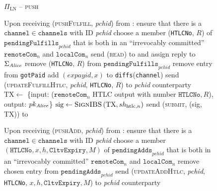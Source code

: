   \begin{figure}[H]
    \begin{protocolbox}{$\Pi_{\mathrm{LN}}$ -- \textsc{push}}
      \begin{algorithmic}[1]
        \State Upon receiving (\textsc{pushFulfill}, \textit{pchid}) from
        \environment:
        \label{alg:protocol:pushfulfill:start}
        \Indent
          \State ensure that there is a $\mathtt{channel} \in \mathtt{channels}$
          with ID \textit{pchid}
          \State choose a member (\texttt{HTLCNo}, $R$) of
          $\mathtt{pendingFulfills}_{\mathit{pchid}}$ that is both in an
          ``irrevocably committed'' $\mathtt{remoteCom}_n$ and
          $\mathtt{localCom}_n$
          \State send (\textsc{read}) to \ledger{} and assign reply to
          $\Sigma_{\mathit{Alice}}$
          \State remove (\texttt{HTLCNo}, $R$) from
          $\mathtt{pendingFulfills}_{\mathit{pchid}}$
           
            \State remove entry from \texttt{gotPaid}
            \State add $(\mathit{expayid}, x)$ to
            \texttt{diffs}(\texttt{channel})
          \EndIf
            \State send (\textsc{updateFulfillHtlc}, \textit{pchid},
            \texttt{HTLCNo}, $R$) to \textit{pchid} counterparty
          \Else \ 
            \State $\mathrm{TX} \gets$ \{input: ($\mathtt{remoteCom}_n$ HTLC
            output with number $\mathtt{HTLCNo}, R$), output:
            $pk_{\mathit{Alice}}$\}
            \State $\mathrm{sig} \gets \textsc{SignIBS}\left(\mathrm{TX},
            sh_{\mathrm{htlc}, n}\right)$
            \State send (\textsc{submit}, (sig, TX)) to \ledger{}
            \label{alg:protocol:pushfulfill:submit}
          \EndIf
          \label{alg:protocol:pushfulfill:end}
        \EndIndent
        \Statex

        \State Upon receiving (\textsc{pushAdd}, \textit{pchid}) from
        \environment:
        \label{alg:protocol:pushadd:start}
        \Indent
          \State ensure that there is a $\mathtt{channel} \in \mathtt{channels}$
          with ID \textit{pchid}
          \State choose a member $\left(\mathtt{HTLCNo}, x, h,
          \mathtt{CltvExpiry}, M\right)$ of
          $\mathtt{pendingAdds}_{\mathit{pchid}}$ that is both in an
          ``irrevocably committed'' $\mathtt{remoteCom}_n$ and
          $\mathtt{localCom}_n$
          \label{alg:protocol:pay:pushadd:choose}
          \State remove chosen entry from
          $\mathtt{pendingAdds}_{\mathit{pchid}}$
          \State send (\textsc{updateAddHtlc}, \textit{pchid}, \texttt{HTLCNo},
          $x, h, \mathtt{CltvExpiry}, M$) to \textit{pchid} counterparty
          \label{alg:protocol:pushadd:end}
        \EndIndent
        \Statex


\end{algorithmic}
\end{protocolbox}
\end{figure}
